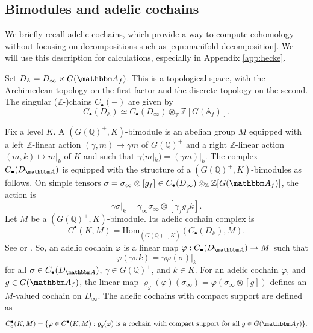 \documentclass[10pt, twoside]{amsart}
\theoremstyle{plain}
\theoremstyle{definition}
\theoremstyle{remark}
\numberwithin{equation}{subsection}
\def\Q{\mathbb Q}
\def\Z{\mathbb Z}
\def\A{\mathbbm A}
\def\Hom{\mathrm{Hom}}
\begin{document}
\subsection{Bimodules and adelic cochains}\label{subsec:adelic-cochains}
We briefly recall adelic cochains, which provide a way to compute cohomology without focusing on decompositions such as \eqref{eqn:manifold-decomposition}. We will use this description for calculations, especially in Appendix \ref{app:hecke}.

Set $D_\mathbb{A} = D_\infty \times G(\A_f)$. This is a topological space, with the Archimedean topology on the first factor and the discrete topology on the second. The singular ($\Z$-)chains $C_{\bullet}(-)$ are given by
\begin{equation}\label{eqn:adelic-chains}
C_\bullet(D_\mathbb{A})\simeq C_\bullet(D_\infty)\otimes_\Z\Z[G(\mathbb{A}_f)].
\end{equation}

Fix a level $K$. A $(G(\Q)^+,K)$-bimodule is an abelian group $M$ equipped with a left $\Z$-linear action $(\gamma,m) \mapsto \gamma m$ of $G(\Q)^+$ and a right $\Z$-linear action $(m,k) \mapsto m|_k$ of $K$ and such that $\gamma(m|_k) = (\gamma m)|_k$. The complex $C_{\bullet}(D_{\A})$ is equipped with the structure of a $(G(\Q)^+,K)$-bimodules as follows. On  simple tensors $\sigma = \sigma_\infty \otimes [g_f] \in C_{\bullet}(D_\infty)\otimes_{\Z} \Z[G(\A_f)]$, the action is
\begin{equation*}
\gamma \sigma|_k = \gamma_\infty \sigma_\infty \otimes [\gamma_f g_fk].
\end{equation*}
Let $M$ be a $(G(\Q)^+,K)$-bimodule. Its adelic cochain complex is \[C^\bullet(K,M)=\Hom_{(G(\Q)^+,{K})}(C_\bullet(D_\mathbb{A}),M).\]  See \cite[\S 2.2]{BH} or \cite[\S 2.1]{Hansen}. So, an adelic cochain $\varphi$ is a linear map $\varphi: C_{\bullet}(D_{\A}) \rightarrow M$ such that 
\begin{equation}\label{eqn:equivariance-condition}
\varphi(\gamma \sigma k ) = \gamma \varphi(\sigma)|_k
\end{equation}
for all $\sigma \in C_{\bullet}(D_{\A})$, $\gamma \in G(\Q)^+$, and $k \in K$. For an adelic cochain $\varphi$, and $g \in G(\A_f)$, the linear map  ${ \varrho_g}(\varphi)(\sigma_\infty) = \varphi(\sigma_\infty \otimes [g])$ defines an $M$-valued cochain on $D_\infty$. The adelic cochains with compact support are defined as
$$
C^\bullet_c(K,M)=\{\varphi\in C^\bullet(K,M):{ \varrho_g}(\varphi) \text{ is a cochain with compact support for all $g \in G(\A_f)$}\}.
$$
\end{document}
